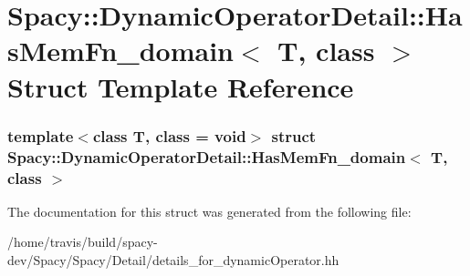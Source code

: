 \hypertarget{structSpacy_1_1DynamicOperatorDetail_1_1HasMemFn__domain}{\section{\-Spacy\-:\-:\-Dynamic\-Operator\-Detail\-:\-:\-Has\-Mem\-Fn\-\_\-domain$<$ \-T, class $>$ \-Struct \-Template \-Reference}
\label{structSpacy_1_1DynamicOperatorDetail_1_1HasMemFn__domain}
}
\subsubsection*{template$<$class T, class = void$>$ struct Spacy\-::\-Dynamic\-Operator\-Detail\-::\-Has\-Mem\-Fn\-\_\-domain$<$ T, class $>$}



\-The documentation for this struct was generated from the following file\-:\begin{DoxyCompactItemize}
\item 
/home/travis/build/spacy-\/dev/\-Spacy/\-Spacy/\-Detail/details\-\_\-for\-\_\-dynamic\-Operator.\-hh\end{DoxyCompactItemize}
